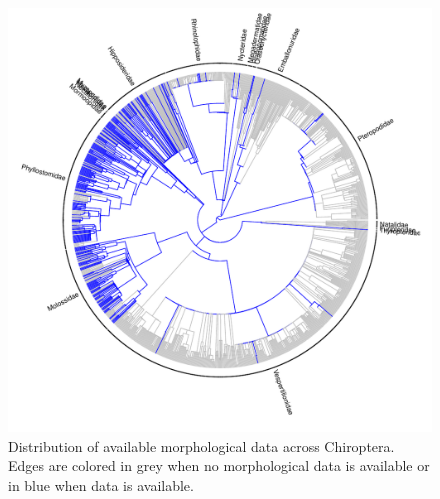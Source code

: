 \documentclass[12pt,letterpaper]{article}
\begin{document}

\begin{figure}[!htbp]
\centering
    \includegraphics[width=1\textwidth]{Supp_figure_CHIROPTERA.pdf}
\caption{Distribution of available morphological data across Chiroptera. Edges are colored in grey when no morphological data is available or in blue when data is available.}
\label{Supp_Figure_Phylo-Chiroptera}
\end{figure}
\end{document}
